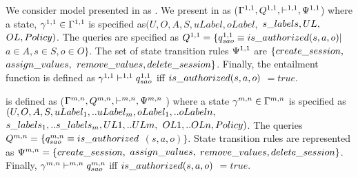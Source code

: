 
We consider \clabac{} model presented in \cite{labac} as \EPOneOneModels{}. We present \EPOneOneModels{} in \TL{} as ($\Gamma^{1,1}, Q^{1,1}, \vdash^{1,1}, \Psi^{1,1}$) where a state,  $ \gamma_{}^{1,1} \in \Gamma^{1,1}$ is  specified as$(U, O, A, S, uLabel, oLabel,$ $ s\_labels{},  UL,$  $ OL, Policy)$. The queries are specified as $Q^{1,1}=\{ q_{sao}^{1,1} \equiv is\_authorized(s, a, o)|$  $ a\in A, s \in S, o \in O \}$. The set of state transition rules $\Psi^{1,1}$ are $\{create\_session,$ $ assign\_values,$ $ remove\_values, delete\_session\}$. Finally, the entailment function is defined as $\gamma_{}^{1,1} \vdash^{1,1} q_{sao}^{1,1}$ iff $is\_authorized(s,a,o)$ $=true$.

\EPMNModel{}  is defined as ($\Gamma^{m,n}, Q^{m,n}, \vdash^{m,n},\Psi^{m,n}$ ) where  a state $ \gamma_{}^{m,n} \in \Gamma^{m,n}$ is specified as  $(U, O, A, S, uLabel_{1},..uLabel_{m}, oLabel_{1},..oLabel{n},$ $ s\_labels_{1},..s\_labels_{m},  UL{1},..UL{m},$  $ OL{1},..OL{n}, Policy)$. The queries  $Q^{m,n}=\{ q_{sao}^{m,n} \equiv is\_authorized$ $(s, a, o) \}$.  State transition rules are represented as $\Psi^{m,n} =  \{create\_session,$ $ assign\_values,$ $ remove\_values, delete\_session\}$. Finally, $\gamma_{}^{m,n} \vdash^{m,n} q_{sao}^{m,n}$ iff $is\_authorized(s,a,o)$ $=true$.


%






